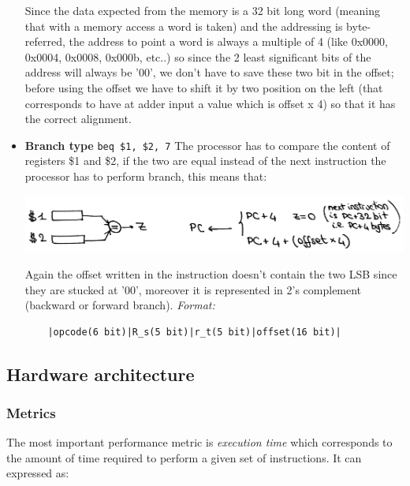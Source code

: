 \begin{itemize}
    Since the data expected from the memory is a 32 bit long word (meaning that
    with a memory access a word is taken) and the addressing is byte-referred,
    the address to point a word is always a multiple of 4 (like 0x0000, 0x0004,
    0x0008, 0x000b, etc..) so since the 2 least significant bits of the address
    will always be '00', we don't have to save these two bit in the offset;
    before using the offset we have to shift it by two position on the left
    (that corresponds to have at adder input a value which is offset x 4) so
    that it has the correct alignment.

  \item \textbf{Branch type}
    \verb|beq $1, $2, 7|
    The processor has to compare the content of registers \$1 and \$2, if the
    two are equal instead of the next instruction the processor has to perform
    branch, this means that:
    \begin{center}
      \includegraphics[width=0.85\linewidth]{img/img3/2}
    \end{center}

    Again the offset written in the instruction doesn't contain the two LSB
    since they are stucked at '00', moreover it is represented in 2's complement
    (backward or forward branch).
    \textit{Format:}
    \begin{verbatim}
    |opcode(6 bit)|R_s(5 bit)|r_t(5 bit)|offset(16 bit)|
    \end{verbatim}

\end{itemize}


\subsection{Hardware architecture}

\subsubsection{Metrics}
The most important performance metric is \textit{execution time} which
corresponds to the amount of time required to perform a given set of
instructions. It can expressed as:

